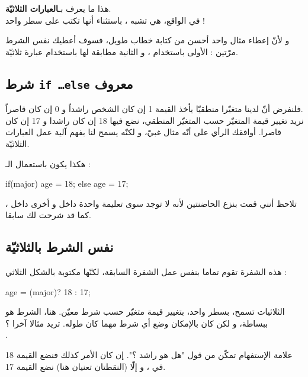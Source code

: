 هذا ما يعرف بـ\textbf{العبارات الثلاثيّة}.\\
في الواقع، هي تشبه
،
باستثناء أنها تكتب على سطر واحد !

و لأنّ إعطاء مثال واحد أحسن من كتابة خطاب طويل، فسوف أعطيك نفس الشرط مرّتين : الأولى باستخدام
،
و الثانية مطابقة لها باستخدام عبارة ثلاثيّة.
\subsection{شرط \texttt{if \dots else} معروف}

فلنفرض أنّ لدينا متغيّرا منطقيّا
يأخذ القيمة 1 إن كان الشخص راشداً و 0 إن كان قاصراً.\\
نريد تغيير قيمة المتغيّر 
حسب المتغيّر المنطقي، نضع فيها 18 إن كان راشدا و 17 إن كان قاصرا. أوافقك الرأي على أنّه مثال غبيّ، و لكنّه يسمح لنا بفهم آلية عمل العبارات الثلاثيّة.

هكذا يكون باستعمال الـ :

\begin{Csource}
if(major)
	age = 18;
else
	age = 17;
\end{Csource}

\begin{information}
تلاحظ أنني قمت بنزع الحاضنتين لأنه لا توجد سوى تعليمة واحدة داخل 
و أخرى داخل 
،
كما قد شرحت لك سابقا.
\end{information}

\subsection{نفس الشرط بالثلاثيّة}

هذه الشفرة تقوم تماما بنفس عمل الشفرة السابقة، لكنّها مكتوبة بالشكل الثلاثي : 

\begin{Csource}
age = (major)? 18 : 17;
\end{Csource}

الثلاثيات تسمح، بسطر واحد، بتغيير قيمة متغيّر حسب شرط معيّن. هنا، الشرط هو
ببساطة، و لكن كان بالإمكان وضع أي شرط مهما كان طوله. تريد مثالا آخرا ؟\\ 
.

علامة الإستفهام تمكّن من قول "هل هو راشد ؟". إن كان الأمر كذلك فنضع القيمة 18 في
،
و إلّا (النقطتان تعنيان
هنا) نضع القيمة 17.

